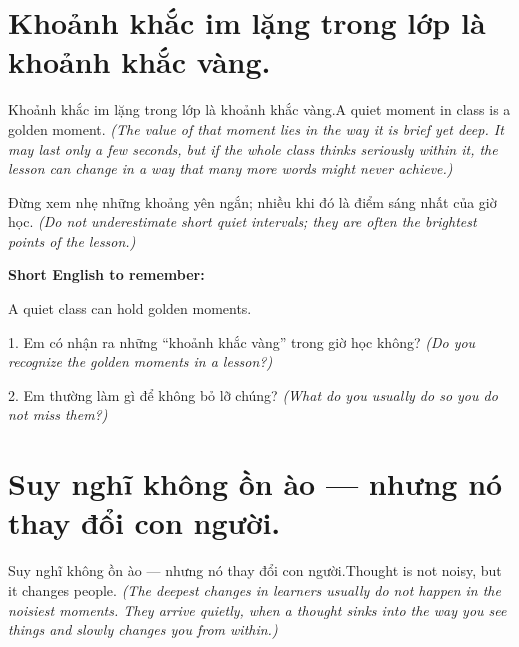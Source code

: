 \section{Khoảnh khắc im lặng trong lớp là khoảnh khắc vàng.}
\begin{truyen}{Khoảnh khắc im lặng trong lớp là khoảnh khắc vàng.}{A quiet moment in class is a golden moment.}
\textit{(The value of that moment lies in the way it is brief yet deep. It may last only a few seconds, but if the whole class thinks seriously within it, the lesson can change in a way that many more words might never achieve.)}
\end{truyen}

\begin{baihoc}
Đừng xem nhẹ những khoảng yên ngắn; nhiều khi đó là điểm sáng nhất của giờ học.
\textit{(Do not underestimate short quiet intervals; they are often the brightest points of the lesson.)}
\end{baihoc}

\begin{ghinhoanh}
\textbf{Short English to remember:}

A quiet class can hold golden moments.

\end{ghinhoanh}

\begin{tuhocnhanh}
1. Em có nhận ra những “khoảnh khắc vàng” trong giờ học không? \textit{(Do you recognize the golden moments in a lesson?)}

2. Em thường làm gì để không bỏ lỡ chúng? \textit{(What do you usually do so you do not miss them?)}
\end{tuhocnhanh}
\ngancach


\section{Suy nghĩ không ồn ào — nhưng nó thay đổi con người.}
\begin{truyen}{Suy nghĩ không ồn ào — nhưng nó thay đổi con người.}{Thought is not noisy, but it changes people.}
\textit{(The deepest changes in learners usually do not happen in the noisiest moments. They arrive quietly, when a thought sinks into the way you see things and slowly changes you from within.)}
\end{truyen}

